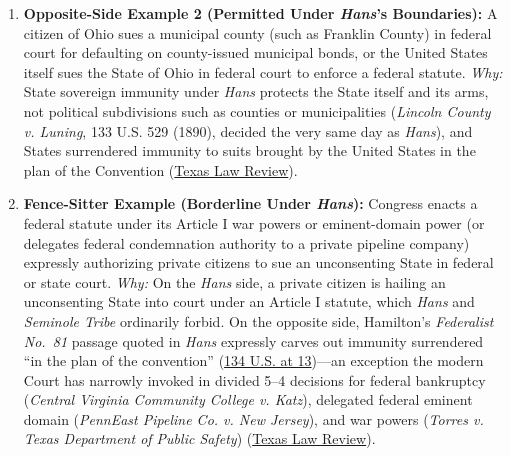 \documentclass[12pt]{article}
\begin{document}
\begin{enumerate}
\item \textbf{Opposite-Side Example 2 (Permitted Under \textit{Hans}'s Boundaries):} A citizen of Ohio sues a municipal county (such as Franklin County) in federal court for defaulting on county-issued municipal bonds, or the United States itself sues the State of Ohio in federal court to enforce a federal statute. \textit{Why:} State sovereign immunity under \textit{Hans} protects the State itself and its arms, not political subdivisions such as counties or municipalities (\textit{Lincoln County v. Luning}, 133 U.S. 529 (1890), decided the very same day as \textit{Hans}), and States surrendered immunity to suits brought by the United States in the plan of the Convention (\href{https://texaslawreview.org/state-sovereign-immunity-after-the-revolution/}{Texas Law Review}).

\item \textbf{Fence-Sitter Example (Borderline Under \textit{Hans}):} Congress enacts a federal statute under its Article I war powers or eminent-domain power (or delegates federal condemnation authority to a private pipeline company) expressly authorizing private citizens to sue an unconsenting State in federal or state court. \textit{Why:} On the \textit{Hans} side, a private citizen is hailing an unconsenting State into court under an Article I statute, which \textit{Hans} and \textit{Seminole Tribe} ordinarily forbid. On the opposite side, Hamilton's \textit{Federalist No.\ 81} passage quoted in \textit{Hans} expressly carves out immunity surrendered ``in the plan of the convention'' (\href{https://supreme.justia.com/cases/federal/us/134/1/}{134 U.S. at 13})---an exception the modern Court has narrowly invoked in divided 5--4 decisions for federal bankruptcy (\textit{Central Virginia Community College v. Katz}), delegated federal eminent domain (\textit{PennEast Pipeline Co. v. New Jersey}), and war powers (\textit{Torres v. Texas Department of Public Safety}) (\href{https://texaslawreview.org/state-sovereign-immunity-after-the-revolution/}{Texas Law Review}).
\end{enumerate}
\end{document}
